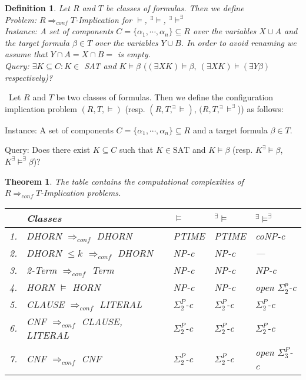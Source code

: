 \documentclass[12pt]{article}
\newcommand{\AM}{\mbox{$^\exists\!\!\models$}}
\newcommand{\AMB}{\mbox{$^\exists\!\!\models^\exists$}}
\newtheorem{definition}{Definition}[section]
\newtheorem{theorem}{Theorem}[section]
\begin{document}
\begin{definition}
 Let $R$ and $T$ be classes of formulas. Then we define\\
{\em Problem:  $R \Longrightarrow_{conf} T$-Implication for $\models$, \AM, \AMB}\\
{\em Instance}: A set of components $C=\{\alpha_1,\cdots,\alpha_n\} \subseteq R$ over the variables $X \cup A$ and the target formula $\beta \in T$ over the variables $Y \cup B$. In order to avoid renaming we assume that $Y \cap A= X \cap B=$ is empty.\\
{\em Query}:
 $ \exists K \subseteq C: K \in$ SAT and $K \models \beta$ $((\exists X K)  \models \beta, \
(\exists X K) \models (\exists Y \beta)$ respectively)?\\
\end{definition}

\color{red}
\ Let $R$ and $T$ be two classes of formulas. Then we define the configuration implication problem
$(R, T, \models)$ (resp. $(R, T, ^\exists\!\models)$, $(R, T,^\exists\!\models^\exists$)) as follows:

\begin{description}
\item {Instance:} A set of components $C=\{\alpha_1,\cdots, \alpha_n\}\subseteq R$ and a target formula $\beta\in T$.
\item {Query:} Does there exist $K\subseteq C$ such that $K\in \mbox{SAT}$ and $K\models \beta$ (resp. $K^\exists\!\!\models \beta$, $K
^\exists\!\!\models^\exists\beta$)?
\end{description}
\color{black}


\begin{theorem}
The table contains the computational complexities of\\ $R \Longrightarrow_{conf} T$-Implication problems.\\
\begin{tabular}{|l|l|l|l|l|}
\hline
 & {\em Classes} &  $\models$ & \AM & \AMB \\ \hline
1. & DHORN $\Rightarrow_{conf}$ DHORN          & PTIME & PTIME  & coNP-c         \\ \hline
2. & DHORN $\leq k$ $\Rightarrow_{conf}$ DHORN & NP-c  & NP-c   & ---         \\ \hline
3. & 2-Term $\Rightarrow_{conf}$ Term          & NP-c  & NP-c   & NP-c           \\ \hline
4. & HORN $\models$ HORN                       & NP-c  & NP-c   & open $\Sigma^p_2$-c \\ \hline
5. & CLAUSE $\Rightarrow_{conf}$ LITERAL       & $\Sigma_2^P$-c & $\Sigma_2^P$-c & $\Sigma_2^P$-c \\ \hline
6. & CNF $\Rightarrow_{conf}$ CLAUSE, LITERAL  & $\Sigma_2^P$-c & $\Sigma_2^P$-c & $\Sigma_2^P$-c \\ \hline
7. & CNF $\Rightarrow_{conf}$ CNF              & $\Sigma_2^P$-c & $\Sigma_2^P$-c & open $\Sigma_3^P$-c \\ \hline
\end{tabular}
\end{theorem}
\end{document}
